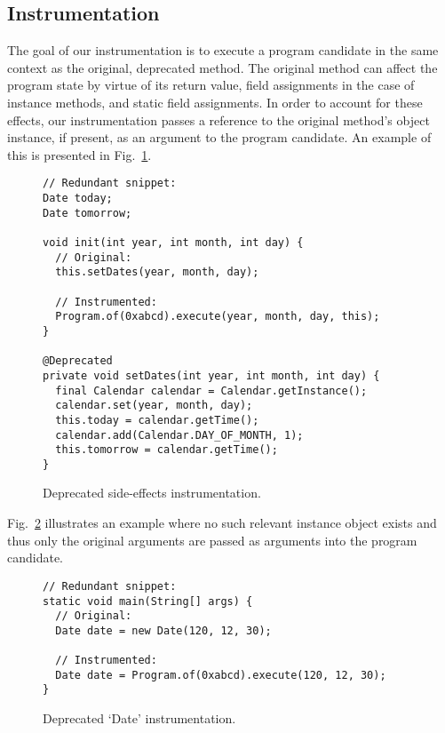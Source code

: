 \documentclass[runningheads,a4paper]{llncs}
\begin{document}
\subsection{Instrumentation}

The goal of our instrumentation is to execute a program candidate in
the same context as the original, deprecated method. The original
method can affect the program state by virtue of its return value,
field assignments in the case of instance methods, and static field
assignments. In order to account for these effects, our
instrumentation passes a reference to the original method's object
instance, if present, as an argument to the program candidate.
An example of this is presented in
Fig.~\ref{ex:side-effects-instrumentation}.

\begin{figure}
\begin{lstlisting}[mathescape=true,showstringspaces=false]
// Redundant snippet:
Date today;
Date tomorrow;
  
void init(int year, int month, int day) {
  // Original:
  this.setDates(year, month, day);

  // Instrumented:
  Program.of(0xabcd).execute(year, month, day, this);
}
  
@Deprecated
private void setDates(int year, int month, int day) {
  final Calendar calendar = Calendar.getInstance();
  calendar.set(year, month, day);
  this.today = calendar.getTime();
  calendar.add(Calendar.DAY_OF_MONTH, 1);
  this.tomorrow = calendar.getTime();
}
\end{lstlisting}
\caption{Deprecated side-effects instrumentation.}
\label{ex:side-effects-instrumentation}
\end{figure}

Fig.~\ref{ex:date-instrumentation} illustrates an example where no
such relevant instance object exists and thus only the original
arguments are passed as arguments into the program candidate.

\begin{figure}
\begin{lstlisting}[mathescape=true,showstringspaces=false]
// Redundant snippet:
static void main(String[] args) {
  // Original:
  Date date = new Date(120, 12, 30);

  // Instrumented:
  Date date = Program.of(0xabcd).execute(120, 12, 30);
}
\end{lstlisting}
\caption{Deprecated `Date' instrumentation.}
\label{ex:date-instrumentation}
\end{figure}
\end{document}
